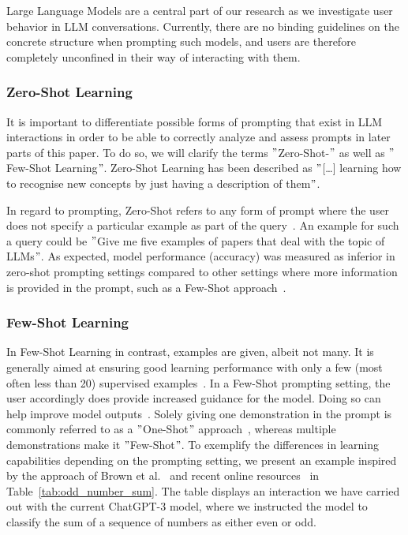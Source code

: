 Large Language Models are a central part of our research as we investigate user behavior in LLM
conversations.
Currently, there are no binding guidelines on the concrete structure when prompting such models,
and users are therefore completely unconfined in their way of interacting with them.


\subsubsection{Zero-Shot Learning} %
It is important to differentiate possible forms of prompting that exist in LLM interactions in order
to be able to correctly analyze and assess prompts in later parts of this paper.
To do so, we will clarify the terms \("\)Zero-Shot-\("\) as well as \("\)Few-Shot Learning\("\).
Zero-Shot Learning has been described as \("\)[\ldots] learning how to recognise
new concepts by just having a description of them\("\)\cite[p. 1]{feris_embarrassingly_2015}.

In regard to prompting, Zero-Shot refers to any form of prompt where the user does not specify
a particular example as part of the query~\cite[p. 1]{dang_how_2022}.
An example for such a query could be \("\)Give me five examples of papers that deal with the topic
of LLMs\("\).
As expected, model performance (accuracy) was measured as inferior in zero-shot prompting settings compared
to other settings where more information is provided in the prompt, such as a Few-Shot approach~\cite[p. 5]{brown_language_2020}.


\subsubsection{Few-Shot Learning}
In Few-Shot Learning in contrast, examples are given, albeit not many.
It is generally aimed at ensuring good learning performance with only a few (most often less than 20)
supervised examples~\cite[p. 1]{samuel_offline_2022}. %
In a Few-Shot prompting setting, the user accordingly does provide increased guidance for the model.
Doing so can help improve model outputs~\cite[p. 1]{dang_how_2022}.
Solely giving one demonstration in the prompt is commonly referred to as a \("\)One-Shot\("\) approach~\cite[p. 6]{brown_language_2020},
whereas multiple demonstrations make it \("\)Few-Shot\("\).
To exemplify the differences in learning capabilities depending on the prompting setting,
we present an example inspired by the approach of Brown et al\(.\)~\cite{brown_language_2020}
and recent online resources~\cite{dairai_few-shot_2023} in Table~\ref{tab:odd_number_sum}.
The table displays an interaction we have carried out with the current ChatGPT-3 model, where we
instructed the model to classify the sum of a sequence of numbers as either even or odd.



